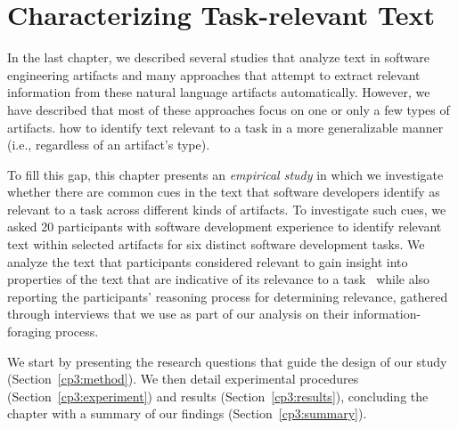 \setcounter{chapter}{2}


\chapter{Characterizing Task-relevant Text}
\label{ch:characterizing}



In the last chapter,
we described several studies that analyze text in software engineering artifacts
and many approaches that attempt to extract relevant information from
these natural language artifacts automatically. However, 
we have described that
most of these approaches focus on 
one or only a 
few types of artifacts.
how to identify text relevant to a task in a more generalizable manner (i.e.,   regardless of an artifact's type).






To fill this gap, 
this chapter presents an
\textit{empirical study} in which we
investigate whether 
there are common cues in the text
that software developers identify as relevant to a task across
different kinds of artifacts.
To investigate such cues, we 
asked 20 participants with
software development experience to identify relevant text within
selected artifacts for six distinct software development tasks.
We analyze the text that participants considered relevant 
to gain insight into properties of the text 
that are indicative of its relevance to a task~\cite{das2014frame, jurafsky2014speech}
while also reporting the participants'
reasoning process for determining relevance,
 gathered through interviews
that we use as part of our analysis on
their information-foraging process.



We start by presenting the research questions that guide 
the design of our study (Section~\ref{cp3:method}).
We then detail experimental procedures (Section~\ref{cp3:experiment}) 
and results (Section~\ref{cp3:results}),
concluding the chapter with a summary of our findings (Section~\ref{cp3:summary}).












